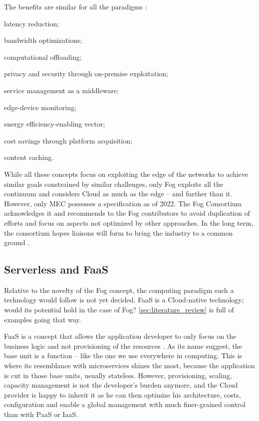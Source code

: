\documentclass[11pt]{sdm}
\begin{document}
The benefits are similar for all the paradigms \cite{ahmed_fog_2019, ai_edge_2018}:
\begin{enumerate*}[(1)]
	\item latency reduction;
	\item bandwidth optimizations;
	\item computational offloading;
	\item privacy and security through on-premise exploitation;
	\item service management as a middleware;
	\item edge-device monitoring;
	\item energy efficiency-enabling vector;
	\item cost savings through platform acquisition;
	\item content caching.
\end{enumerate*}

While all these concepts focus on exploiting the edge of the networks to achieve similar goals constrained by similar challenges, only Fog exploits all the continuum and considers Cloud as much as the edge -- and further than it. However, only \gls{MEC} possesses a specification as of 2022. The Fog Consortium acknowledges it and recommends to the Fog contributors to avoid duplication of efforts and focus on aspects not optimized by other approaches. In the long term, the consortium hopes liaisons will form to bring the industry to a common ground \cite{ieee_standards_association_ieee_2018}.

\hypersetup{linkcolor=}
\subsection{Serverless and \acrfull{FaaS}}

Relative to the novelty of the Fog concept, the computing paradigm such a technology would follow is not yet decided. \gls{FaaS} is a Cloud-native technology; would its potential hold in the case of Fog? \cref{sec:literature_review} is full of examples going that way.

\gls{FaaS} is a concept that allows the application developer to only focus on the business logic and not provisioning of the resources \cite{redhat_what_2020}. As its name suggest, the base unit is a function -- like the one we use everywhere in computing. This is where its resemblance with microservices shines the most, because the application is cut in those base units, usually stateless. However, provisioning, scaling, capacity management is not the developer's burden anymore, and the Cloud provider is happy to inherit it as he can then optimize his architecture, costs, configuration and enable a global management with much finer-grained control than with \gls{PaaS} or \gls{IaaS}.
\end{document}
